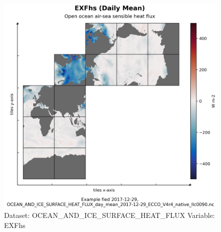 \begin{figure}[H]
\centering
\includegraphics[width=\textwidth]{../images/plots/native_plots/Ocean_and_Sea-Ice_Surface_Heat_Fluxes/EXFhs.png}
\caption{Dataset: OCEAN\_AND\_ICE\_SURFACE\_HEAT\_FLUX Variable: EXFhs}
\label{tab:table-OCEAN_AND_ICE_SURFACE_HEAT_FLUX_EXFhs-Plot}
\end{figure}
\pagebreak
